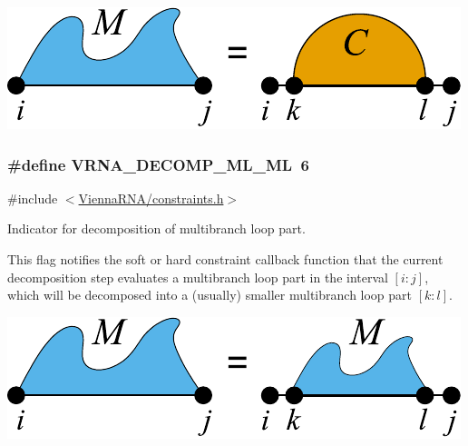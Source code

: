  
\begin{DoxyImageNoCaption}
  \mbox{\includegraphics[width=\textwidth,height=\textheight/2,keepaspectratio=true]{decomp_ml_stem}}
\end{DoxyImageNoCaption}
\subsubsection[{\texorpdfstring{V\+R\+N\+A\+\_\+\+D\+E\+C\+O\+M\+P\+\_\+\+M\+L\+\_\+\+ML}{VRNA_DECOMP_ML_ML}}]{\setlength{\rightskip}{0pt plus 5cm}\#define V\+R\+N\+A\+\_\+\+D\+E\+C\+O\+M\+P\+\_\+\+M\+L\+\_\+\+ML~6}\hypertarget{group__constraints_ga7f4cb9ff7a33e67f0539bd39e7b19a78}{}\label{group__constraints_ga7f4cb9ff7a33e67f0539bd39e7b19a78}


{\ttfamily \#include $<$\hyperlink{constraints_8h}{Vienna\+R\+N\+A/constraints.\+h}$>$}



Indicator for decomposition of multibranch loop part. 

This flag notifies the soft or hard constraint callback function that the current decomposition step evaluates a multibranch loop part in the interval $[i:j]$, which will be decomposed into a (usually) smaller multibranch loop part $[k:l]$.

 
\begin{DoxyImageNoCaption}
  \mbox{\includegraphics[width=\textwidth,height=\textheight/2,keepaspectratio=true]{decomp_ml_ml}}
\end{DoxyImageNoCaption}
